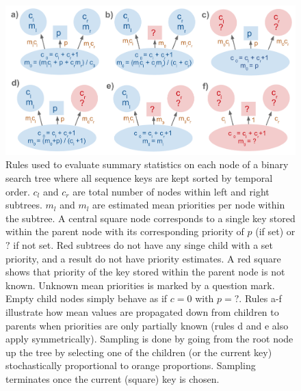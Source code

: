 \documentclass{article}
\begin{document}
\begin{figure}
\centering
\begin{minipage}{1.0\textwidth}  
  \centering
  \includegraphics[width=1.0\textwidth]{priority_rule}
  \caption{Rules used to evaluate summary statistics on each node of a binary 
    search tree where all sequence keys are kept sorted by temporal order. 
    $c_l$ and $c_r$ are total number of nodes within left and right subtrees. 
    $m_l$ and $m_l$ are estimated mean priorities per node within the subtree. 
    A central square node corresponds to a single key stored within the parent 
    node with its corresponding priority of $p$ (if set) or $?$ if not set. 
    Red subtrees do not have any singe child with a set priority, and a result 
    do not have priority estimates. A red square shows that priority of the key 
    stored within the parent node is not known. Unknown mean priorities is 
    marked by a question mark. Empty child nodes simply behave as if $c=0$ with 
    $p=?$. Rules a-f illustrate how mean values are propagated down from 
    children to parents when priorities are only partially known (rules d and e 
    also apply symmetrically). Sampling is done by going from the root node up 
    the tree by selecting one of the children (or the current key) 
    stochastically proportional to orange proportions. Sampling terminates once 
    the current (square) key is chosen.}
  \label{priority-rule}
\end{minipage}%
\end{figure}
\end{document}
